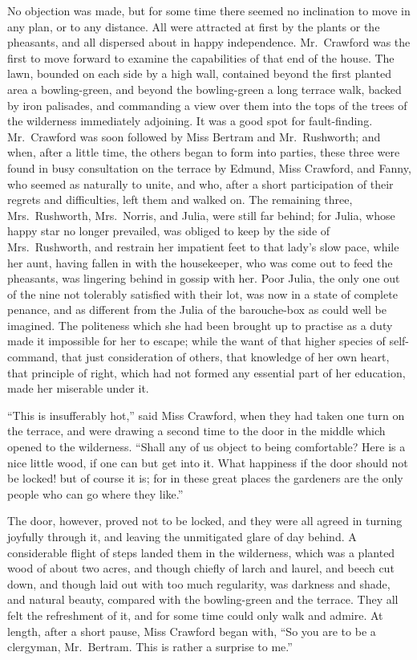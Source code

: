 \documentclass{article}
\begin{document}
No objection was made, but for some time there seemed
no inclination to move in any plan, or to any distance.
All were attracted at first by the plants or the pheasants,
and all dispersed about in happy independence.
Mr.\ Crawford was the first to move forward to examine
the capabilities of that end of the house.  The lawn,
bounded on each side by a high wall, contained beyond
the first planted area a bowling-green, and beyond
the bowling-green a long terrace walk, backed by iron
palisades, and commanding a view over them into the tops
of the trees of the wilderness immediately adjoining.
It was a good spot for fault-finding. Mr.\ Crawford was soon
followed by Miss Bertram and Mr.\ Rushworth; and when,
after a little time, the others began to form into parties,
these three were found in busy consultation on the terrace
by Edmund, Miss Crawford, and Fanny, who seemed as naturally
to unite, and who, after a short participation of their
regrets and difficulties, left them and walked on.
The remaining three, Mrs.\ Rushworth, Mrs.\ Norris,
and Julia, were still far behind; for Julia, whose happy
star no longer prevailed, was obliged to keep by the side
of Mrs.\ Rushworth, and restrain her impatient feet to that
lady's slow pace, while her aunt, having fallen in with
the housekeeper, who was come out to feed the pheasants,
was lingering behind in gossip with her.  Poor Julia,
the only one out of the nine not tolerably satisfied
with their lot, was now in a state of complete penance,
and as different from the Julia of the barouche-box
as could well be imagined.  The politeness which she had
been brought up to practise as a duty made it impossible
for her to escape; while the want of that higher species
of self-command, that just consideration of others,
that knowledge of her own heart, that principle of right,
which had not formed any essential part of her education,
made her miserable under it.

``This is insufferably hot,'' said Miss Crawford, when they
had taken one turn on the terrace, and were drawing
a second time to the door in the middle which opened to
the wilderness.  ``Shall any of us object to being comfortable?
Here is a nice little wood, if one can but get into it.
What happiness if the door should not be locked! but of
course it is; for in these great places the gardeners
are the only people who can go where they like.''

The door, however, proved not to be locked, and they were
all agreed in turning joyfully through it, and leaving
the unmitigated glare of day behind.  A considerable
flight of steps landed them in the wilderness, which was
a planted wood of about two acres, and though chiefly
of larch and laurel, and beech cut down, and though laid
out with too much regularity, was darkness and shade,
and natural beauty, compared with the bowling-green
and the terrace.  They all felt the refreshment of it,
and for some time could only walk and admire.  At length,
after a short pause, Miss Crawford began with, ``So you
are to be a clergyman, Mr.\ Bertram.  This is rather
a surprise to me.''
\end{document}
